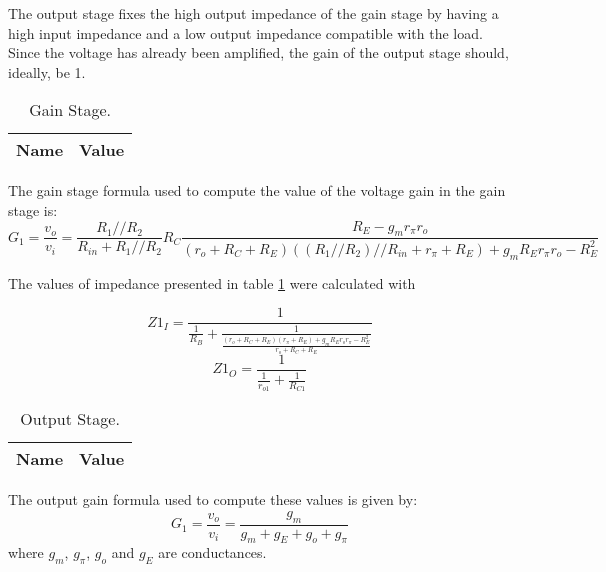 The output stage fixes the high output impedance of the gain stage by having a high input impedance and a low output impedance compatible with the load. Since the voltage has already been amplified, the gain of the output stage should, ideally, be 1.

\begin{table}[H]
\centering
    \begin{tabular}{c|c}        %
\hline                      %

\textbf{Name}  & \textbf{Value}\\     
\hline                      %

\hline                      %
\end{tabular}
    \caption{Gain Stage.}
 \label{tab_gain}
\end{table} 



The gain stage formula used to compute the value of the voltage gain in the gain stage is:
\begin{equation}
    G_1=\frac{v_o}{v_i}= \frac{R_1//R_2}{R_{in}+R_1//R_2}R_C\frac{R_E-g_m r_\pi r_o}{(r_o+R_C+R_E)((R_1//R_2)//R_{in}+r_\pi+R_E)+g_m R_E r_\pi r_o-R_E^2}
\end{equation}

The values of impedance presented in table \ref{tab_gain} were calculated with

\begin{equation}
    Z1_I=\frac{1}{\frac{1}{R_B}+\frac{1}{\frac{(r_{o}+R_{C}+R_{E})(r_{\pi}+R_{E})+g_{m} R_{E} r_{o} r_{\pi} - R_{E}^2}{r_{o}+R_{C}+R_{E}}}}
\end{equation}
\begin{equation}
    Z1_O=\frac{1}{\frac{1}{r_{o1}}+\frac{1}{R_{C1}}}
\end{equation}


\begin{table}[H]
\centering
    \begin{tabular}{c|c}        %
\hline                      %

\textbf{Name}  & \textbf{Value}\\     
\hline                      %

\hline                      %
\end{tabular}
    \caption{Output Stage.}
 \label{tab_output}
\end{table} 
The output gain formula used to compute these values is given by:
\begin{equation}
    G_1=\frac{v_o}{v_i}=\frac{g_m}{g_m+g_E+g_o+g_\pi}
\end{equation}
where $g_m$, $g_\pi$, $g_o$ and $g_E$ are conductances.

